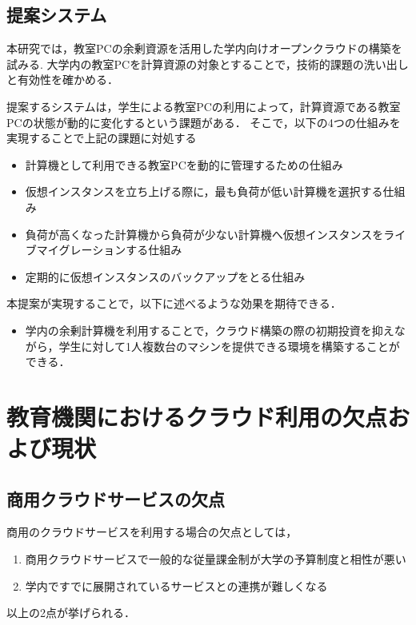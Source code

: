 \documentclass[11pt,a4paper]{jsarticle}
\begin{document}
\subsection{提案システム}
本研究では，教室PCの余剰資源を活用した学内向けオープンクラウドの構築を試みる.
大学内の教室PCを計算資源の対象とすることで，技術的課題の洗い出しと有効性を確かめる．
\par 提案するシステムは，学生による教室PCの利用によって，計算資源である教室PCの状態が動的に変化するという課題がある．
そこで，以下の4つの仕組みを実現することで上記の課題に対処する
\begin{itemize}
	\item 計算機として利用できる教室PCを動的に管理するための仕組み
	\item 仮想インスタンスを立ち上げる際に，最も負荷が低い計算機を選択する仕組み
	\item 負荷が高くなった計算機から負荷が少ない計算機へ仮想インスタンスをライブマイグレーションする仕組み
	\item 定期的に仮想インスタンスのバックアップをとる仕組み
\end{itemize}

\par 本提案が実現することで，以下に述べるような効果を期待できる．
\begin{itemize}
	\item 学内の余剰計算機を利用することで，クラウド構築の際の初期投資を抑えながら，学生に対して1人複数台のマシンを提供できる環境を構築することができる．
\end{itemize}


\section{教育機関におけるクラウド利用の欠点および現状}
\subsection{商用クラウドサービスの欠点}
商用のクラウドサービスを利用する場合の欠点としては，
\begin{enumerate}
	\item 商用クラウドサービスで一般的な従量課金制が大学の予算制度と相性が悪い
	\item 学内ですでに展開されているサービスとの連携が難しくなる
\end{enumerate}
以上の2点が挙げられる．
\end{document}
